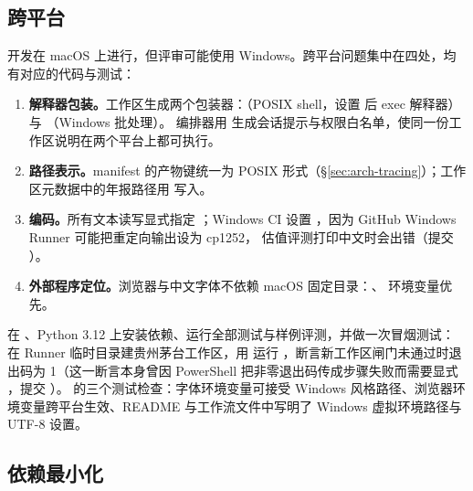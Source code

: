 \subsection{跨平台}
\label{sec:arch-platform}

开发在 macOS 上进行，但评审可能使用 Windows。跨平台问题集中在四处，均有对应的代码与测试：

\begin{enumerate}
  \item \textbf{解释器包装。}工作区生成两个包装器：（POSIX shell，设置  后 exec 解释器）与 （Windows 批处理）。
        编排器用  生成会话提示与权限白名单，使同一份工作区说明在两个平台上都可执行。
  \item \textbf{路径表示。}manifest 的产物键统一为 POSIX 形式（\S\ref{sec:arch-tracing}）；工作区元数据中的年报路径用  写入。
  \item \textbf{编码。}所有文本读写显式指定 ；Windows CI 设置 ，因为 GitHub Windows Runner 可能把重定向输出设为 cp1252，
        估值评测打印中文时会出错（提交 ）。
  \item \textbf{外部程序定位。}浏览器与中文字体不依赖 macOS 固定目录：、 环境变量优先。
\end{enumerate}

 在 、Python 3.12 上安装依赖、运行全部测试与样例评测，并做一次冒烟测试：
在 Runner 临时目录建贵州茅台工作区，用  运行 ，断言新工作区闸门未通过时退出码为 1（这一断言本身曾因 PowerShell 把非零退出码传成步骤失败而需要显式 ，提交 ）。
 的三个测试检查：字体环境变量可接受 Windows 风格路径、浏览器环境变量跨平台生效、README 与工作流文件中写明了 Windows 虚拟环境路径与 UTF-8 设置。

\subsection{依赖最小化}
\label{sec:arch-deps}

